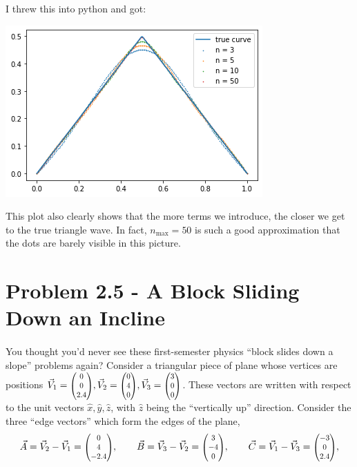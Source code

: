 \documentclass{article}
\begin{document}
\begin{solution}
    I threw this into python and got:
    \begin{center}
        \includegraphics[scale=0.8]{image.png}
    \end{center}
    This plot also clearly shows that the more terms we introduce, the closer we get to the true triangle wave. In fact, $n_{\text{max}} = 50$ is such a good approximation that the dots are barely visible in this picture. 
\end{solution}


\bigskip
\dphline
\pagebreak
\section*{Problem 2.5 - A Block Sliding Down an Incline}

\paragraph{}
You thought you'd never see these first-semester physics ``block slides down a slope'' problems again?  Consider a triangular piece of plane whose vertices are positions 
$\vec{V}_{1} = \smthreevect{0}{0}{2.4}, \vec{V}_{2} = \smthreevect{0}{4}{0}, \vec{V}_{3} = \smthreevect{3}{0}{0}$.  These vectors are written with respect to the unit vectors 
$\hat{x}, \hat{y},\hat{z}$, with $\hat{z}$ being the ``vertically up'' direction.  Consider the three ``edge vectors'' which form the edges of the plane,
	\begin{equation*}
		\vec{A} = \vec{V}_{2}-\vec{V}_{1} = \smthreevect{0}{4}{-2.4},	\qquad 
		\vec{B} = \vec{V}_{3}-\vec{V}_{2} = \smthreevect{3}{-4}{0},		\qquad
		\vec{C} = \vec{V}_{1}-\vec{V}_{3} = \smthreevect{-3}{0}{2.4},
	\end{equation*}
\end{document}
